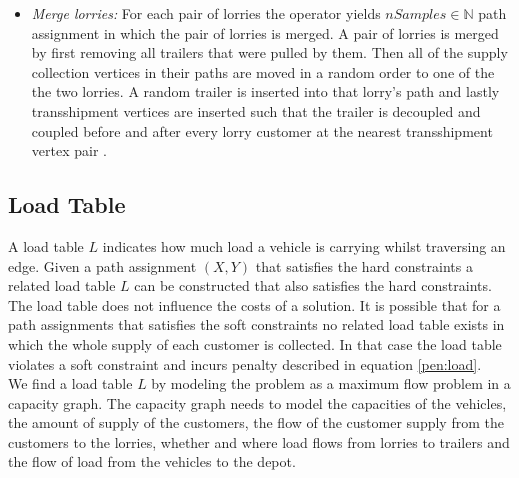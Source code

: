 \begin{itemize}
  \item \textit{Merge lorries:} For each pair of lorries the operator  yields $nSamples \in \mathbb N$  path assignment in which the pair of lorries is merged. A pair of lorries is merged by first removing all trailers that were pulled by them. Then all of the supply collection vertices in their paths are moved in a random order to one of the the two lorries. A random trailer is inserted into that lorry's path and lastly transshipment vertices are inserted such that the  trailer is decoupled and coupled before and after every lorry customer at the nearest transshipment vertex pair .
\end{itemize}


\subsection{Load Table}
\label{sec:load}
A load table
$L$
indicates how much load a vehicle is carrying whilst traversing an edge.
Given a path assignment $(X,Y)$ that satisfies the hard constraints a related load table
$L$
can be constructed  that also satisfies the hard constraints.
 The load table does not influence the costs of a solution.
 It is  possible that for a path assignments that satisfies the soft constraints no related load table exists in which the whole supply of each customer is collected.
In that case the load table violates a soft constraint and incurs penalty described in equation \eqref{pen:load}.
\\

We find a load table $L$ by modeling the problem as a maximum flow problem in a capacity graph.
The capacity graph needs to model the capacities of the vehicles,
the amount of supply of the customers,
the flow of the customer supply from the customers to the lorries,
whether and where load flows from lorries to trailers   and
the flow of load from the vehicles to the depot.\\





